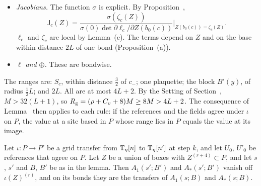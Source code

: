\begin{step}
\begin{itemize}
\item[(iv)] \emph{Jacobians.} The function $\sigma$ is explicit. By Proposition~,
\[
\mathsf J_c(Z)=\frac{\sigma(\zeta_c(Z))}{\sigma(0)\det\partial\ell_c/\partial Z(b_0(c))}\Big|_{Z(b_0(c))=\zeta_c(Z)} .
\]
$\ell_c$ and $\zeta_c$ are local by Lemma~(c). The terms depend on $Z$ and on the base within distance $2L$ of one bond (Proposition~(a)).
\item[(v)] \emph{$\ell$ and $\oplus$.} These are bondwise.
\end{itemize}
\end{step}

\begin{step}
The ranges are: $S_c$, within distance $\frac32$ of $c_-$; one plaquette; the block $B'(y)$, of radius $\frac12L$; and $2L$. All are at most $4L+2$. By the Setting of Section~, $M>32(L+1)$, so $R_{\rm g}=(\rho+C_v+8)M\ge8M>4L+2$. The consequence of Lemma~ then applies to each rule: if the references and the fields agree under $\iota$ on $P$, the value at a site based in $P$ whose range lies in $P$ equals the value at its image.
\end{step}

\begin{detail}\label{d11b:gl-bg}
Let $\iota:P\to P'$ be a grid transfer from $\mathbb T_\eta[n]$ to $\mathbb T_\eta[n']$ at step $k$, and let $U_0$, $U'_0$ be references that agree on $P$. Let $Z$ be a union of boxes with $Z^{(r+4)}\subset P$, and let $s$, $s'$ and $B$, $B'$ be as in the lemma. Then $A_1(s';B')$ and $A_*(s';B')$ vanish off $\iota(Z)^{(r)}$, and on its bonds they are the transfers of $A_1(s;B)$ and $A_*(s;B)$.
\end{detail}

